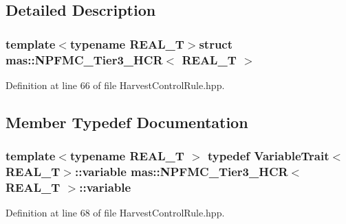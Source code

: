 \subsection{Detailed Description}
\subsubsection*{template$<$typename R\-E\-A\-L\-\_\-\-T$>$struct mas\-::\-N\-P\-F\-M\-C\-\_\-\-Tier3\-\_\-\-H\-C\-R$<$ R\-E\-A\-L\-\_\-\-T $>$}



Definition at line 66 of file Harvest\-Control\-Rule.\-hpp.



\subsection{Member Typedef Documentation}
\hypertarget{structmas_1_1_n_p_f_m_c___tier3___h_c_r_a255d04535c769276bb11c0a7e003d775}{
\subsubsection[{variable}]{\setlength{\rightskip}{0pt plus 5cm}template$<$typename R\-E\-A\-L\-\_\-\-T $>$ typedef {\bf Variable\-Trait}$<$R\-E\-A\-L\-\_\-\-T$>$\-::{\bf variable} {\bf mas\-::\-N\-P\-F\-M\-C\-\_\-\-Tier3\-\_\-\-H\-C\-R}$<$ R\-E\-A\-L\-\_\-\-T $>$\-::{\bf variable}}}\label{structmas_1_1_n_p_f_m_c___tier3___h_c_r_a255d04535c769276bb11c0a7e003d775}


Definition at line 68 of file Harvest\-Control\-Rule.\-hpp.



